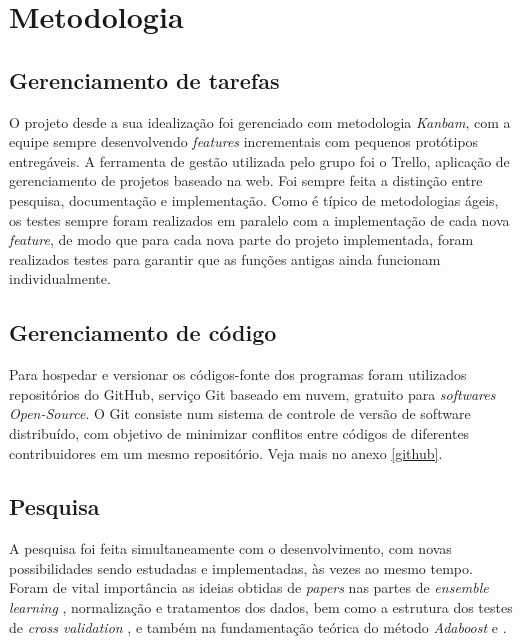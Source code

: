 \chapter{Metodologia}

\section{Gerenciamento de tarefas}
O projeto desde a sua idealização foi gerenciado com metodologia \textit{Kanbam}, com a equipe sempre desenvolvendo \textit{features} incrementais com pequenos protótipos entregáveis. A ferramenta de gestão utilizada pelo grupo foi o Trello, aplicação de gerenciamento de projetos baseado na web. Foi sempre feita a distinção entre pesquisa, documentação e implementação. Como é típico de metodologias ágeis, os testes sempre foram realizados em paralelo com a implementação de cada nova \textit{feature}, de modo que para cada nova parte do projeto implementada, foram realizados testes para garantir que as funções antigas ainda funcionam individualmente.
\section{Gerenciamento de código}
Para hospedar e versionar os códigos-fonte dos programas foram utilizados repositórios do GitHub, serviço Git baseado em nuvem, gratuito para \textit{softwares Open-Source}. O Git consiste num sistema de controle de versão de software distribuído, com objetivo de minimizar conflitos entre códigos de diferentes contribuidores em um mesmo repositório. Veja mais no anexo \ref{github}.

\section{Pesquisa} 
A pesquisa foi feita simultaneamente com o desenvolvimento, com novas possibilidades sendo estudadas e implementadas, às vezes ao mesmo tempo. Foram de vital importância as ideias obtidas de \textit{papers} nas partes de \textit{ensemble learning} \cite{comparativeEN}, normalização e tratamentos dos dados, bem como a estrutura dos testes de \textit{cross validation} \cite{comparative}, e também na fundamentação teórica do método \textit{Adaboost} \cite{explainingadaboost} e \cite{adaboost}.